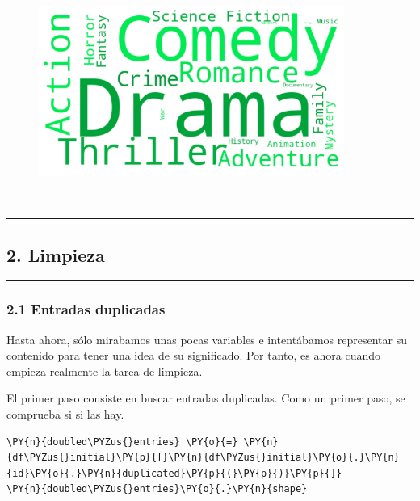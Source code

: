 \begin{figure}[h]
    \centering
    \captionsetup{width=10cm}
    \includegraphics[width=10cm]{./contenido/imagenes/output_29_0.png}

\end{figure}
    { \hspace*{\fill} \\}
    
    \begin{center}\rule{0.5\linewidth}{\linethickness}\end{center}

\subsection{2. Limpieza}\label{limpieza}

\begin{center}\rule{0.5\linewidth}{\linethickness}\end{center}

\subsubsection{2.1 Entradas duplicadas}\label{entradas-duplicadas}

Hasta ahora, sólo mirabamos unas pocas variables e intentábamos
representar su contenido para tener una idea de su significado. Por
tanto, es ahora cuando empieza realmente la tarea de limpieza.

El primer paso consiste en buscar entradas duplicadas. Como un primer
paso, se comprueba si si las hay.

    \begin{tcolorbox}[breakable, size=fbox, boxrule=1pt, pad at break*=1mm,colback=cellbackground, colframe=cellborder]
\begin{Verbatim}[commandchars=\\\{\}]
\PY{n}{doubled\PYZus{}entries} \PY{o}{=} \PY{n}{df\PYZus{}initial}\PY{p}{[}\PY{n}{df\PYZus{}initial}\PY{o}{.}\PY{n}{id}\PY{o}{.}\PY{n}{duplicated}\PY{p}{(}\PY{p}{)}\PY{p}{]}
\PY{n}{doubled\PYZus{}entries}\PY{o}{.}\PY{n}{shape}
\end{Verbatim}
\end{tcolorbox}


